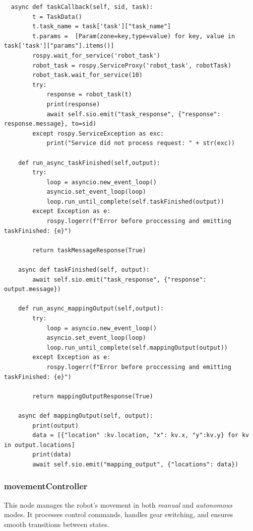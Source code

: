 \documentclass[a4paper,12pt]{extreport}
\begin{document}
  \begin{verbatim}
  async def taskCallback(self, sid, task):
        t = TaskData()
        t.task_name = task['task']["task_name"]
        t.params =  [Param(zone=key,type=value) for key, value in task['task']["params"].items()]
        rospy.wait_for_service('robot_task')
        robot_task = rospy.ServiceProxy('robot_task', robotTask)
        robot_task.wait_for_service(10)
        try:
            response = robot_task(t)
            print(response)
            await self.sio.emit("task_response", {"response": response.message}, to=sid)
        except rospy.ServiceException as exc:
            print("Service did not process request: " + str(exc))   

    def run_async_taskFinished(self,output):
        try:
            loop = asyncio.new_event_loop()
            asyncio.set_event_loop(loop)
            loop.run_until_complete(self.taskFinished(output))
        except Exception as e:
            rospy.logerr(f"Error before proccessing and emitting taskFinished: {e}")

        return taskMessageResponse(True)
    
    async def taskFinished(self, output):
        await self.sio.emit("task_response", {"response": output.message})

    def run_async_mappingOutput(self,output):
        try:
            loop = asyncio.new_event_loop()
            asyncio.set_event_loop(loop)
            loop.run_until_complete(self.mappingOutput(output))
        except Exception as e:
            rospy.logerr(f"Error before proccessing and emitting taskFinished: {e}")

        return mappingOutputResponse(True)
    
    async def mappingOutput(self, output):
        print(output)
        data = [{"location" :kv.location, "x": kv.x, "y":kv.y} for kv in output.locations]
        print(data)
        await self.sio.emit("mapping_output", {"locations": data})
\end{verbatim}


\subsubsection{movementController}

This node manages the robot's movement in both \emph{manual} and
\emph{autonomous} modes. It processes control commands, handles gear
switching, and ensures smooth transitions between states.
\end{document}
